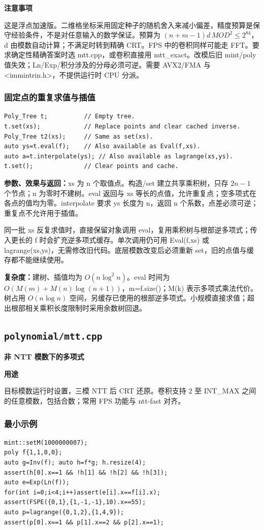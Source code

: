 \documentclass[UTF8,a4paper,10pt]{ctexart}
\newcommand{\TemplUsage}[1]{\textbf{用途}\par #1\par}
\newcommand{\TemplNote}[1]{\textbf{注意事项}\par #1\par}
\begin{document}
\TemplNote{这是浮点加速版。二维格坐标采用固定种子的随机舍入来减小偏差，精度预算是保守经验条件，不是对任意输入的数学保证。预算为 $(n+m-1)d\,MOD^2\le 2^{84}$，d 由模数自动计算；不满足时转到精确 CRT。FPS 中的卷积同样可能走 FFT。要求确定性精确答案时选 mtt.cpp，或卷积直接用 mtt\_exact。改模后旧 mint/poly 值失效；Ln/Exp/积分涉及的分母必须可逆。需要 AVX2/FMA 与 <immintrin.h>，不提供运行时 CPU 分派。}

\noindent\begin{minipage}{\textwidth}
\subsubsection*{固定点的重复求值与插值}
\begin{lstlisting}
Poly_Tree t;          // Empty tree.
t.set(xs);            // Replace points and clear cached inverse.
Poly_Tree t2(xs);     // Same as set(xs).
auto ys=t.eval(f);    // Also available as Eval(f,xs).
auto a=t.interpolate(ys); // Also available as lagrange(xs,ys).
t.set();              // Clear points and cache.
\end{lstlisting}
\textbf{参数、效果与返回：}xs 为 n 个取值点。构造/set 建立共享乘积树，只存 $2n-1$ 个节点；n 为零时不建树。eval 返回与 xs 等长的点值，允许重复点；空多项式在各点的值均为零。interpolate 要求 ys 长度为 n，返回 n 个系数，点差必须可逆；重复点不允许用于插值。

同一批 xs 反复求值时，直接保留对象调用 eval，复用乘积树与根部逆多项式；传入更长的 f 时会扩充逆多项式缓存。单次调用仍可用 Eval(f,xs) 或 lagrange(xs,ys)，无需修改旧代码。底层模数改变后必须重新 set，旧的点值与缓存都不能继续使用。

\textbf{复杂度：}建树、插值均为 $O(n\log^2 n)$。eval 时间为 $O(M(m)+M(n)\log(n+1))$，m=f.size()；M(k) 表示多项式乘法代价。树占用 $O(n\log n)$ 空间，另缓存已使用的根部逆多项式。小规模直接求值；超出根部相关乘积长度限制时采用余数树回退。
\end{minipage}\par
\clearpage
\subsection{\texttt{polynomial/mtt.cpp}}
\textbf{非 NTT 模数下的多项式}\par
\TemplUsage{目标模数运行时设置，三模 NTT 后 CRT 还原。卷积支持 2 至 INT\_MAX 之间的任意模数，包括合数；常用 FPS 功能与 ntt-fast 对齐。}
\subsubsection*{最小示例}
\begin{lstlisting}
mint::setM(1000000007);
poly f{1,1,0,0};
auto g=Inv(f); auto h=f*g; h.resize(4);
assert(h[0].x==1 && !h[1] && !h[2] && !h[3]);
auto e=Exp(Ln(f));
for(int i=0;i<4;i++)assert(e[i].x==f[i].x);
assert(FSPE({0,1},{1,-1,-1},10).x==55);
auto p=lagrange({0,1,2},{1,4,9});
assert(p[0].x==1 && p[1].x==2 && p[2].x==1);
\end{lstlisting}
\end{document}

